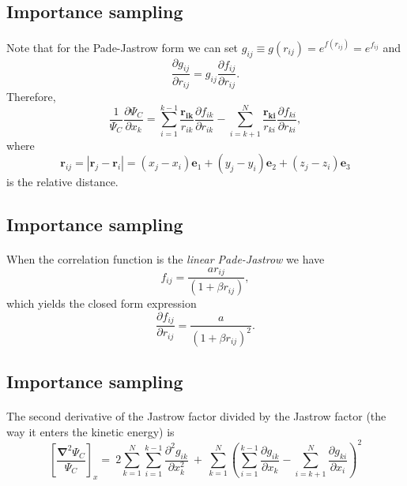 \documentclass[%
twoside,                 %
final,                   %
10pt]{article}
\begin{document}
\subsection*{Importance sampling}

\paragraph{}
Note that for the Pade-Jastrow form we can set $g_{ij} \equiv g(r_{ij}) = e^{f(r_{ij})} = e^{f_{ij}}$ and 
\[
\frac{\partial g_{ij}}{\partial r_{ij}} = g_{ij} \frac{\partial f_{ij}}{\partial r_{ij}}.
\]
Therefore, 
\[
\frac{1}{\Psi_{C}}\frac{\partial \Psi_{C}}{\partial x_k} =
\sum_{i=1}^{k-1}\frac{\mathbf{r_{ik}}}{r_{ik}}\frac{\partial f_{ik}}{\partial r_{ik}}
-\sum_{i=k+1}^{N}\frac{\mathbf{r_{ki}}}{r_{ki}}\frac{\partial f_{ki}}{\partial r_{ki}},
\]
where 
\[
 \mathbf{r}_{ij} = |\mathbf{r}_j - \mathbf{r}_i| = (x_j - x_i)\mathbf{e}_1 + (y_j - y_i)\mathbf{e}_2 + (z_j - z_i)\mathbf{e}_3
\]
is the relative distance.




\subsection*{Importance sampling}

\paragraph{}
When the correlation function is the \emph{linear Pade-Jastrow} we have
\[
f_{ij} = \frac{a r_{ij}}{(1 + \beta r_{ij})},
\]
which yields the closed form expression
\[
\frac{\partial f_{ij}}{\partial r_{ij}} = \frac{a}{(1 + \beta r_{ij})^2}.
\]




\subsection*{Importance sampling}

\paragraph{}
The second derivative of the Jastrow factor divided by the Jastrow factor (the way it enters the kinetic energy) is
\[
\left[\frac{\mathbf{\nabla}^2 \Psi_C}{\Psi_C}\right]_x =\  
2\sum_{k=1}^{N}
\sum_{i=1}^{k-1}\frac{\partial^2 g_{ik}}{\partial x_k^2}\ +\ 
\sum_{k=1}^N
\left(
\sum_{i=1}^{k-1}\frac{\partial g_{ik}}{\partial x_k} -
\sum_{i=k+1}^{N}\frac{\partial g_{ki}}{\partial x_i}
\right)^2
\]
\end{document}
